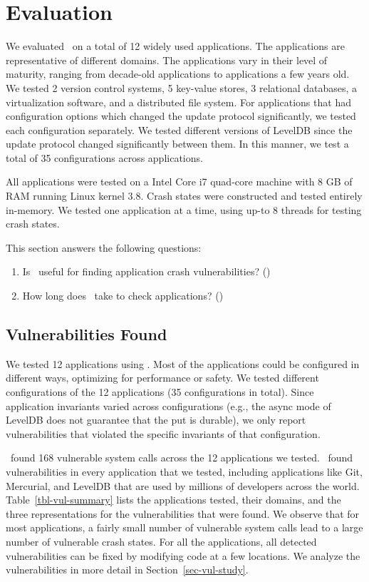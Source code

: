 \section{Evaluation}
We evaluated \toolname\ on a total of 12 widely used applications. The
applications are representative of different domains. The applications vary in
their level of maturity, ranging from decade-old applications to applications a
few years old. We tested 2 version control systems, 5 key-value stores, 3
relational databases, a virtualization software, and a distributed file system.
For applications that had configuration options which changed the update
protocol significantly, we tested each configuration separately. We tested
different versions of LevelDB since the update protocol changed significantly
between them. In this manner, we test a total of 35 configurations across
applications. 

All applications were tested on a Intel Core i7 quad-core machine with 8 GB of
RAM running Linux kernel 3.8. Crash states were constructed and tested
entirely in-memory. We tested one application at a time, using up-to 8 threads
for testing crash states. 

This section answers the following questions:
\begin{enumerate}
\item Is \toolname\ useful for finding application crash vulnerabilities?
()
\item How long does \toolname\ take to check applications?
()
\end{enumerate}

\subsection{Vulnerabilities Found}
\label{sec-report}
 

We tested 12 applications using \toolname. Most of the applications could be
configured in different ways, optimizing for performance or safety. We tested
different configurations of the 12 applications (35 configurations in total).
Since application invariants varied across configurations (e.g., the async mode
of LevelDB does not guarantee that the put is durable), we only report
vulnerabilities that violated the specific invariants of that configuration. 

\toolname\ found 168 vulnerable system calls across the 12 applications we
tested. \toolname\ found vulnerabilities in every application that we tested,
including applications like Git, Mercurial, and LevelDB that are used by
millions of developers across the world.  Table~\ref{tbl-vul-summary} lists the
applications tested, their domains, and the three representations for the
vulnerabilities that were found. We observe that for most applications, a
fairly small number of vulnerable system calls lead to a large number of
vulnerable crash states. For all the applications, all detected vulnerabilities
can be fixed by modifying code at a few locations. We analyze the
vulnerabilities in more detail in Section~\ref{sec-vul-study}. 

